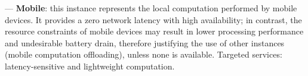 --- \textbf{Mobile}: this instance represents the local computation performed by mobile devices. It provides a zero network latency with high availability; in contrast, the resource constraints of mobile devices may result in lower processing performance and undesirable battery drain, therefore justifying the use of other instances (mobile computation offloading), unless none is available. Targeted services: latency-sensitive and lightweight computation.



